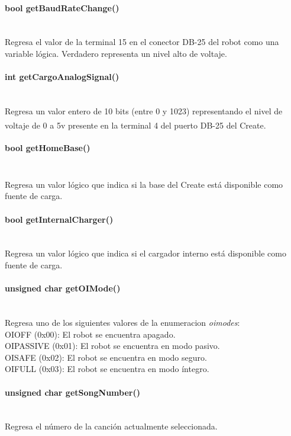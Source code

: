 \documentclass[letterpaper,openright,12pt]{book}
\begin{document}
\paragraph{bool getBaudRateChange()}\mbox{}\\
Regresa el valor de la terminal 15 en el conector DB-25 del robot como una variable lógica. Verdadero representa un nivel alto de voltaje.\\
\paragraph{int getCargoAnalogSignal()}\mbox{}\\
Regresa un valor entero de 10 bits (entre 0 y 1023) representando el nivel de voltaje de 0 a 5v presente en la terminal 4 del puerto DB-25 del Create\textsuperscript{\textregistered}.\\
\paragraph{bool getHomeBase()}\mbox{}\\
Regresa un valor lógico que indica si la base del Create\textsuperscript{\textregistered} está disponible como fuente de carga.\\
\paragraph{bool getInternalCharger()}\mbox{}\\
Regresa un valor lógico que indica si el cargador interno está disponible como fuente de carga.\\
\paragraph{unsigned char getOIMode()}\mbox{}\\
Regresa uno de los siguientes valores de la enumeracion \emph{oimodes}:\\
OIOFF (0x00): El robot se encuentra apagado.\\
OIPASSIVE (0x01): El robot se encuentra en modo pasivo.\\
OISAFE (0x02): El robot se encuentra en modo seguro.\\
OIFULL (0x03): El robot se encuentra en modo íntegro.\\
\paragraph{unsigned char getSongNumber()}\mbox{}\\
Regresa el número de la canción actualmente seleccionada.\\
\end{document}

